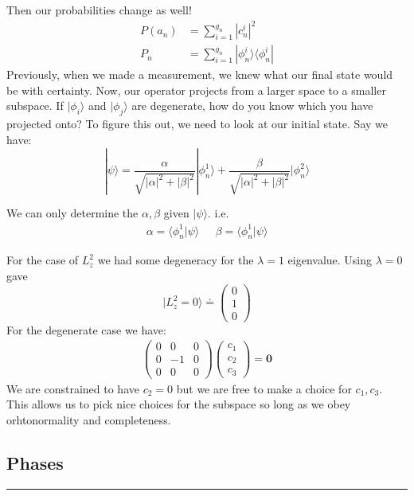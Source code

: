 \documentclass[a4paper, 11pt]{article}
\begin{document}
Then our probabilities change as well! 
	\begin{align}
		P(a_n) &= \sum\limits_{i=1}^{g_n} |c_n^i|^2 \\ 
		P_n &= \sum\limits_{i=1}^{g_n} |\phi_n^i\rangle\langle \phi_n^i | 
	\end{align}
Previously, when we made a measurement, we knew what our final state would be with certainty. Now, our operator projects from a larger space to a smaller subspace. If $|\phi_i\rangle$ and $|\phi_j\rangle$ are degenerate, how do you know which you have projected onto? To figure this out, we need to look at our initial state. Say we have:
	\begin{equation*}
		|\psi\rangle = \frac{\alpha}{\sqrt{|\alpha|^2+|\beta|^2}}|\phi_n^1\rangle + \frac{\beta}{\sqrt{|\alpha|^2+|\beta|^2}}|\phi_n^2\rangle
	\end{equation*}

We can only determine the $\alpha, \beta$ given $|\psi\rangle$. i.e. 
	\begin{align*}
		\alpha = \langle \phi_n^1|\psi\rangle &\text{   } \beta = \langle\phi_n^1|\psi\rangle 
	\end{align*}

For the case of $L_z^2$ we had some degeneracy for the $\lambda =1$ eigenvalue. Using $\lambda=0$ gave 
	\begin{equation*}
		|L_z^2 = 0\rangle \doteq \begin{pmatrix}0 \\ 1 \\ 0 \end{pmatrix}
	\end{equation*}
For the degenerate case we have: 
	\begin{align*}
		\begin{pmatrix}
			0 & 0 & 0 \\ 
			0 & -1 & 0 \\ 
			0 & 0 & 0
		\end{pmatrix} \begin{pmatrix}c_1 \\ c_2 \\ c_3\end{pmatrix} = \mathbf{0}
	\end{align*}
We are constrained to have $c_2=0$ but we are free to make a choice for $c_1, c_3$. This allows us to pick nice choices for the subspace so long as we obey orhtonormality and completeness. 



\subsection*{Phases} 
\par\noindent\rule{\textwidth}{0.4pt}
\end{document}
